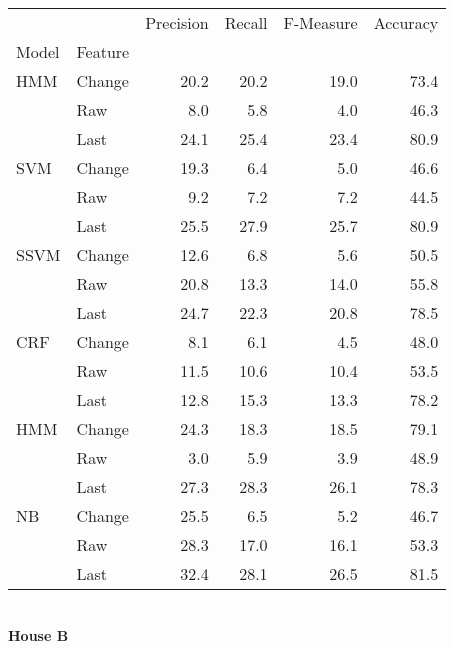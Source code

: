 \documentclass{article}
\begin{document}
\begin{tabular}{llrrrr}
\toprule
    &        &  Precision &  Recall &  F-Measure &  Accuracy \\
Model & Feature &            &         &            &           \\
\midrule
HMM & Change &       20.2 &    20.2 &       19.0 &      73.4 \\
    & Raw &        8.0 &     5.8 &        4.0 &      46.3 \\
    & Last &       24.1 &    25.4 &       23.4 &      80.9 \\
SVM & Change &       19.3 &     6.4 &        5.0 &      46.6 \\
    & Raw &        9.2 &     7.2 &        7.2 &      44.5 \\
    & Last &       25.5 &    27.9 &       25.7 &      80.9 \\
SSVM & Change &       12.6 &     6.8 &        5.6 &      50.5 \\
    & Raw &       20.8 &    13.3 &       14.0 &      55.8 \\
    & Last &       24.7 &    22.3 &       20.8 &      78.5 \\
CRF & Change &        8.1 &     6.1 &        4.5 &      48.0 \\
    & Raw &       11.5 &    10.6 &       10.4 &      53.5 \\
    & Last &       12.8 &    15.3 &       13.3 &      78.2 \\
HMM & Change &       24.3 &    18.3 &       18.5 &      79.1 \\
    & Raw &        3.0 &     5.9 &        3.9 &      48.9 \\
    & Last &       27.3 &    28.3 &       26.1 &      78.3 \\
NB & Change &       25.5 &     6.5 &        5.2 &      46.7 \\
    & Raw &       28.3 &    17.0 &       16.1 &      53.3 \\
    & Last &       32.4 &    28.1 &       26.5 &      81.5 \\
\bottomrule
\end{tabular}
\vspace{1cm}\\
\textbf{House B}\\
\vspace{1cm}\\
\end{document}
